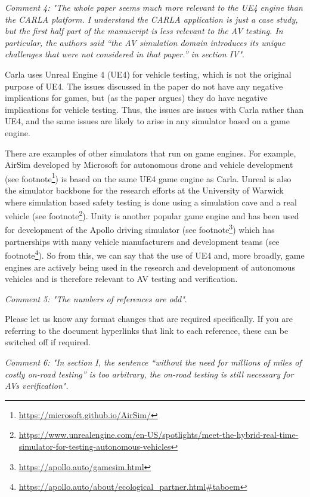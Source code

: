 \documentclass[11pt, a4paper]{letter} %
\begin{document}
\begin{letter}
\bigskip


\textit{Comment 4: "The whole paper seems much more relevant to the UE4 engine than the CARLA platform. I understand the CARLA application is just a case study, but the first half part of the manuscript is less relevant to the AV testing. In particular, the authors said “the AV simulation domain introduces its unique challenges that were not considered in that paper.” in section IV"}.

Carla uses Unreal Engine 4 (UE4) for vehicle testing, which is not the original purpose of UE4. The issues discussed in the paper do not have any negative implications for games, but (as the paper argues) they do have negative implications for vehicle testing. Thus, the issues are issues with Carla rather than UE4, and the same issues are likely to arise in any simulator based on a game engine.

There are examples of other simulators that run on game engines. For example, AirSim developed by Microsoft for autonomous drone and vehicle development (see footnote\footnote{\url{https://microsoft.github.io/AirSim/}}) is based on the same UE4 game engine as Carla. Unreal is also the simulator backbone for the research efforts at the University of Warwick where simulation based safety testing is done using a simulation cave and a real vehicle (see footnote\footnote{\url{https://www.unrealengine.com/en-US/spotlights/meet-the-hybrid-real-time-simulator-for-testing-autonomous-vehicles}}). Unity is another popular game engine and has been used for development of the Apollo driving simulator (see footnote\footnote{\url{https://apollo.auto/gamesim.html}}) which has partnerships with many vehicle manufacturers and development teams (see footnote\footnote{\url{https://apollo.auto/about/ecological\_partner.html#taboem}}). So from this, we can say that the use of UE4 and, more broadly, game engines are actively being used in the research and development of autonomous vehicles and is therefore relevant to AV testing and verification. 


\bigskip

\newpage
\textit{Comment 5: "The numbers of references are odd"}.

Please let us know any format changes that are required specifically. If you are referring to the document hyperlinks that link to each reference, these can be switched off if required.


\bigskip


\textit{Comment 6: "In section I, the sentence “without the need for millions of miles of costly on-road testing” is too arbitrary, the on-road testing is still necessary for AVs verification"}.


\end{letter}
\end{document}
